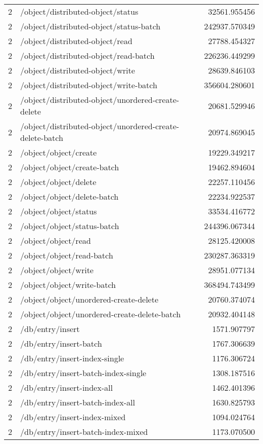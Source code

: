 \begin{longtable}{rlr}
2 & /object/distributed-object/status & 32561.955456 \\
2 & /object/distributed-object/status-batch & 242937.570349 \\
2 & /object/distributed-object/read & 27788.454327 \\
2 & /object/distributed-object/read-batch & 226236.449299 \\
2 & /object/distributed-object/write & 28639.846103 \\
2 & /object/distributed-object/write-batch & 356604.280601 \\
2 & /object/distributed-object/unordered-create-delete & 20681.529946 \\
2 & /object/distributed-object/unordered-create-delete-batch & 20974.869045 \\
2 & /object/object/create & 19229.349217 \\
2 & /object/object/create-batch & 19462.894604 \\
2 & /object/object/delete & 22257.110456 \\
2 & /object/object/delete-batch & 22234.922537 \\
2 & /object/object/status & 33534.416772 \\
2 & /object/object/status-batch & 244396.067344 \\
2 & /object/object/read & 28125.420008 \\
2 & /object/object/read-batch & 230287.363319 \\
2 & /object/object/write & 28951.077134 \\
2 & /object/object/write-batch & 368494.743499 \\
2 & /object/object/unordered-create-delete & 20760.374074 \\
2 & /object/object/unordered-create-delete-batch & 20932.404148 \\
2 & /db/entry/insert & 1571.907797 \\
2 & /db/entry/insert-batch & 1767.306639 \\
2 & /db/entry/insert-index-single & 1176.306724 \\
2 & /db/entry/insert-batch-index-single & 1308.187516 \\
2 & /db/entry/insert-index-all & 1462.401396 \\
2 & /db/entry/insert-batch-index-all & 1630.825793 \\
2 & /db/entry/insert-index-mixed & 1094.024764 \\
2 & /db/entry/insert-batch-index-mixed & 1173.070500 \\

\end{longtable}
